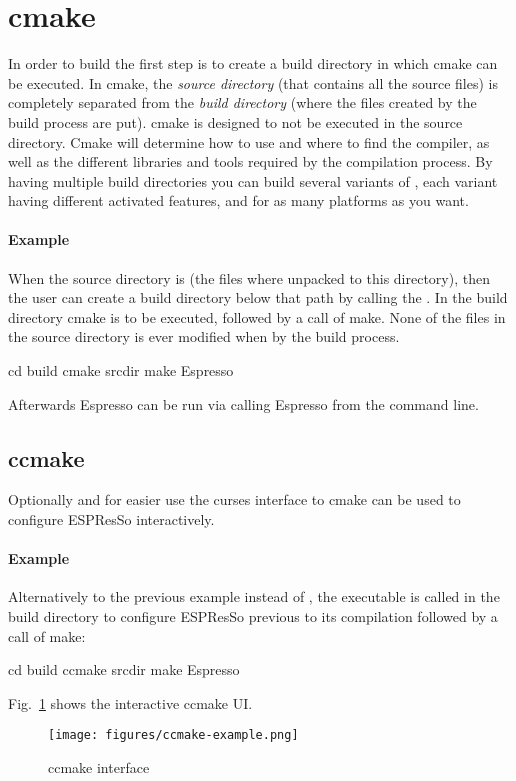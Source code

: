 \section{cmake}
In order to build \es the first step is to create a build directory in which cmake can be executed. In cmake, the \emph{source directory} (that contains all the source
files) is completely separated from the \emph{build directory} (where the files created by the build process are put). cmake is designed to not be executed in the source directory.
Cmake will determine how to use and where to find
the compiler, as well as the different libraries and tools required by
the compilation process. By having multiple build directories you can build several
variants of \es, each variant having different activated features, and
for as many platforms as you want.

\paragraph{Example}
When the source directory is  (\ie the files where
unpacked to this directory), then the user can create a build directory
 below that path by calling the . In the build directory cmake is to be executed, followed by a call of make. None of the files in the source directory is ever modified when by the build process.
\begin{code}
cd build
cmake srcdir
make
Espresso
\end{code}
Afterwards Espresso can be run via calling Espresso from the command line.
\subsection{ccmake}
Optionally and for easier use the curses interface to cmake can be used to configure ESPResSo interactively. 
\paragraph{Example}
Alternatively to the previous example instead of , the  executable is called in the build directory to configure ESPResSo previous to its compilation followed by a call of make:
\begin{code}
cd build
ccmake srcdir
make
Espresso
\end{code}
Fig.~\ref{fig:ccmake} shows the interactive ccmake UI.
\begin{figure}[tb]
  \centering
  \texttt{[image: figures/ccmake-example.png]}
  \caption{ccmake interface}
  \label{fig:ccmake}
\end{figure}



